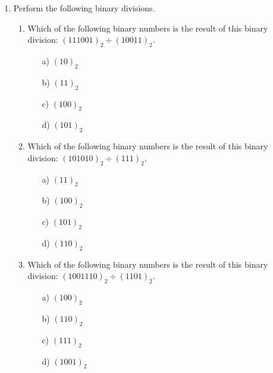 \documentclass[]{report}
\begin{document}
\begin{enumerate}

\item Perform the following binary divisions.

\begin{enumerate}
\item Which of the following binary numbers is the result of this binary division: $(111001)_{2} \div ( 10011)_{2}$. %
\begin{multicols}{2}
\begin{itemize}
\item[a)] $(10)_2$ %
\item[b)] $(11)_{2}$ %
\item[c)] $(100)_{2}$ %
\item[d)] $(101)_{2}$ %
\end{itemize}
\end{multicols}
\item Which of the following binary numbers is the result of this binary division: $(101010)_{2} \div ( 111 )_{2}$. %
\begin{multicols}{2}
\begin{itemize}
\item[a)] $(11)_2$ %
\item[b)] $(100)_{2}$ %
\item[c)] $(101)_{2}$ %
\item[d)] $(110)_{2}$ %
\end{itemize}
\end{multicols}
\item Which of the following binary numbers is the result of this binary division: $(1001110)_{2} \div ( 1101 )_{2}$. %
\begin{multicols}{2}
\begin{itemize}

\item[a)] $(100)_{2}$ %
\item[b)] $(110)_{2}$ %
\item[c)] $(111)_{2}$ %
\item[d)] $(1001)_2$ %
\end{itemize}
\end{multicols}
\end{enumerate}


\end{enumerate}
\end{document}
